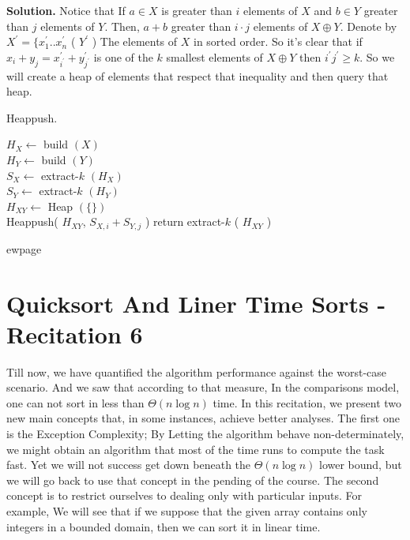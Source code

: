 \textbf{Solution.} Notice that If $a \in X$ is greater than $i$ elements of $X$ and $b \in Y$ greater than $j$ elements of $Y$. Then, $a + b$  greater than $i\cdot j$ elements of $X \oplus Y$. Denote by $X^\prime = \{ x^{\prime}_{1} .. x^{\prime}_{n}$ ( $Y^{\prime}$ ) The elements of $X$ in sorted order. So it's clear that if $x_{i}+y_{j} = x^{\prime}_{i^{\prime}} + y^{\prime}_{j^{\prime}}$ is one of the $k$ smallest elements of $X\oplus Y$ then $i^{\prime}j^{\prime} \ge k$. So we will create a heap of elements that respect that inequality and then query that heap.

\begin{algbox}{Heappush.}
\begin{algorithm}[H]
$ H_{X} \leftarrow $ build $\left( X \right)$  \\ 
$ H_{Y} \leftarrow $ build $\left( Y \right)$  \\
$ S_{X} \leftarrow $ extract-$k$ $\left( H_{X} \right)$  \\ 
$ S_{Y} \leftarrow $ extract-$k$ $\left( H_{Y} \right)$  \\
$ H_{XY} \leftarrow $ Heap $(\{ \} )$ \\
 {
   {
  	Heappush( $H_{XY}$, $S_{X,i} + S_{Y, j}$ )    
  }
}
return extract-$k$ ( $H_{XY}$ ) 
\end{algorithm}
\end{algbox}
\fi




ewpage\section{Quicksort And Liner Time Sorts  - Recitation 6} 
\author{Quicksort, Countingsort, Radixsort, And Bucketsort.}


Till now, we have quantified the algorithm performance against the worst-case scenario. And we saw that according to that measure, In the comparisons model, one can not sort in less than $\Theta\left( n\log n \right) $ time. In this recitation, we present two new main concepts that, in some instances, achieve better analyses. The first one is the Exception Complexity; By Letting the algorithm behave non-determinately, we might obtain an algorithm that most of the time runs to compute the task fast. Yet we will not success get down beneath the $\Theta\left(n\log n\right)$ lower bound, but we will go back to use that concept in the pending of the course. The second concept is to restrict ourselves to dealing only with particular inputs. For example, We will see that if we suppose that the given array contains only integers in a bounded domain, then we can sort it in linear time.  

